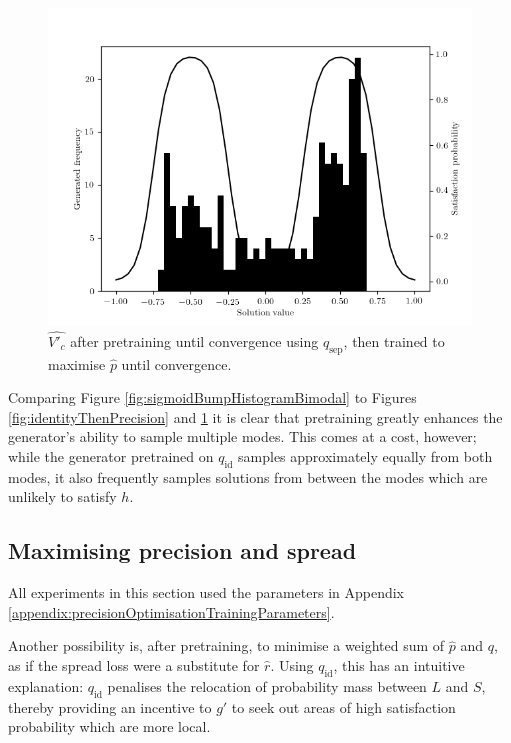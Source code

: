 \documentclass[../../main.tex]{subfiles}
\begin{document}
\begin{figure}[H]
    \begin{center}
    \includegraphics[width=\textwidth]{separationThenPrecision}
    \caption{
        $\hat{V'_c}$ after pretraining until convergence using $q_\text{sep}$, then trained to maximise $\hat{p}$ until convergence.
    }
    \label{fig:separationThenPrecision}
    \end{center}
\end{figure}
Comparing Figure \ref{fig:sigmoidBumpHistogramBimodal} to Figures \ref{fig:identityThenPrecision} and \ref{fig:separationThenPrecision} it is clear that pretraining greatly enhances the generator's ability to sample multiple modes.
This comes at a cost, however; while the generator pretrained on $q_\text{id}$ samples approximately equally from both modes, it also frequently samples solutions from between the modes which are unlikely to satisfy $h$.

\subsection{Maximising precision and spread} \label{subsection:maximisingPrecisionAndSpread}

All experiments in this section used the parameters in Appendix \ref{appendix:precisionOptimisationTrainingParameters}.

Another possibility is, after pretraining, to minimise a weighted sum of $\hat{p}$ and $q$, as if the spread loss were a substitute for $\hat{r}$.
Using $q_\text{id}$, this has an intuitive explanation: $q_\text{id}$ penalises the relocation of probability mass between $L$ and $S$, thereby providing an incentive to $g'$ to seek out areas of high satisfaction probability which are more local.
\end{document}
